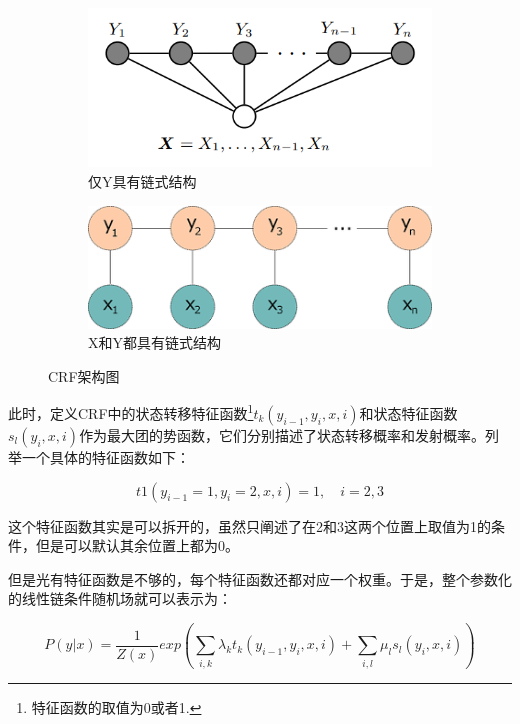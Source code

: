 \documentclass[11pt]{article}
\begin{document}
\begin{figure}[h]
\begin{subfigure}{0.5\textwidth}
	\includegraphics[width=0.9\linewidth]{../images/crf} 
	\caption{仅Y具有链式结构}
	\label{fig:subim1}
\end{subfigure}
\begin{subfigure}{0.5\textwidth}
	\includegraphics[width=0.9\linewidth]{../images/crf_2}
	\caption{X和Y都具有链式结构}
	\label{fig:subim2}
\end{subfigure}

\caption{CRF架构图}
\label{fig:image2}
\end{figure}

此时，定义CRF中的状态转移特征函数\footnote{特征函数的取值为0或者1.}$t_k(y_{i-1}, y_i, x, i)$和状态特征函数$s_l(y_i, x, i)$作为最大团的势函数，它们分别描述了状态转移概率和发射概率。列举一个具体的特征函数如下：

\begin{equation}\label{key}
	t1(y_{i-1}=1, y_i=2, x, i) = 1, \quad i=2, 3
\end{equation}

这个特征函数其实是可以拆开的，虽然只阐述了在2和3这两个位置上取值为1的条件，但是可以默认其余位置上都为0。

但是光有特征函数是不够的，每个特征函数还都对应一个权重。于是，整个参数化的线性链条件随机场就可以表示为：

\begin{equation}\label{key}
	P(y|x) = \frac{1}{Z(x)}exp(\sum_{i,k}\lambda_k t_k(y_{i-1}, y_i, x, i) + \sum_{i, l}\mu_l s_l(y_i, x, i))
\end{equation}
\end{document}
